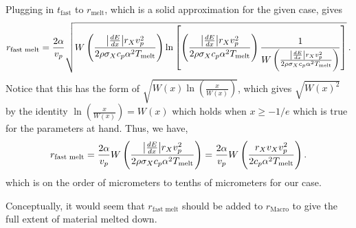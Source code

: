 \documentclass{article}
\newcommand*\te[1]{\text{#1}}
\newcommand*\p[1]{\left(#1\right)}
\newcommand*\ps[1]{\left[#1\right]}
\newcommand*\f[2]{\frac{#1}{#2}}
\begin{document}
Plugging in $t_{\te{fast}}$ to $r_\te{melt}$, which is a solid approximation for the given case, gives
\begin{align}
r_\te{fast melt} =  \frac{2\alpha}{v_p}\sqrt{W\p{{\f{\abs{\frac{dE}{dx}}r_{X}v_p^2}{2 \rho \sigma_X c_p \alpha^2 T_\te{melt}}}}\ln\ps{\p{\frac{\abs{\frac{dE}{dx}}r_{X}v_p^2}{2 \rho \sigma_X c_p \alpha^2 T_\te{melt}}}\frac{1}{W\p{{\f{\abs{\frac{dE}{dx}}r_{X}v_p^2}{2 \rho \sigma_X c_p \alpha^2 T_\te{melt}}}}
}}}\,.
\end{align}
Notice that this has the form of $\sqrt{W(x)\ln\p{{\frac{x}{W(x)}}}}$, which gives $\sqrt{W(x)^2}$ by the identity $\ln\p{{\frac{x}{W(x)}}} = W(x)$ which holds when $x \geq -1/e$ which is true for the parameters at hand.  Thus, we have,
\begin{align}
r_\te{fast melt} =\frac{2\alpha}{v_p}W\p{{\f{\abs{\frac{dE}{dx}}r_{X}v_p^2}{2 \rho \sigma_X c_p \alpha^2 T_\te{melt}}}} = \frac{2\alpha}{v_p}W\p{\frac{r_{X}v_{X} v_p^2}{2 c_p \alpha^2 T_\te{melt}}}.
\end{align}
which is on the order of micrometers to tenths of micrometers for our case.

Conceptually, it would seem that $r_\te{fast melt}$ should be added to $r_\te{Macro}$ to give the full extent of material melted down.
\end{document}
